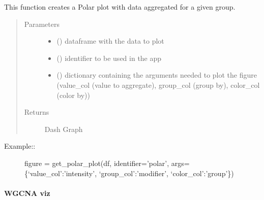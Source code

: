 \documentclass[letterpaper,10pt,english]{sphinxmanual}
\begin{document}
\begin{fulllineitems}
\label{\detokenize{_autosummary/analytics_core.viz:analytics_core.viz.viz.get_polar_plot}}
This function creates a Polar plot with data aggregated for a given group.
\begin{quote}\begin{description}
\item[{Parameters}] \leavevmode\begin{itemize}
\item {} 
 () \textendash{} dataframe with the data to plot

\item {} 
 () \textendash{} identifier to be used in the app

\item {} 
 () \textendash{} dictionary containing the arguments needed to plot the figure (value\_col (value to aggregate), group\_col (group by), color\_col (color by))

\end{itemize}

\item[{Returns}] \leavevmode
Dash Graph

\end{description}\end{quote}
\begin{description}
\item[{Example::}] \leavevmode
figure = get\_polar\_plot(df, identifier=’polar’, args=\{‘value\_col’:’intensity’, ‘group\_col’:’modifier’, ‘color\_col’:’group’\})

\end{description}

\end{fulllineitems}



\paragraph{WGCNA viz}
\label{\detokenize{_autosummary/analytics_core.viz:module-analytics_core.viz.wgcnaFigures}}\label{\detokenize{_autosummary/analytics_core.viz:wgcna-viz}}
\end{document}
